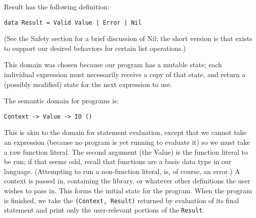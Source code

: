 \documentclass{article}
\begin{document}
Result has the following definition:

\begin{lstlisting}
data Result = Valid Value | Error | Nil
\end{lstlisting}

(See the Safety section for a brief discussion of Nil; the short version is that exists to support our desired behaviors for certain list operations.)

This domain was chosen because our program has a mutable state; each individual expression must necessarily receive a copy of that state, and return a (possibly modified) state for the next expression to use.

The semantic domain for programs is:

\begin{lstlisting}
Context -> Value -> IO ()
\end{lstlisting}

This is akin to the domain for statement evaluation, except that we cannot take an expression (because no program is yet running to evaluate it) so we must take a raw function literal. The second argument (the Value) is the function literal to be run; if that seems odd, recall that functions are a basic data type in our language. (Attempting to run a non-function literal, is, of course, an error.)  A context is passed in, containing the library, or whatever other definitions the user wishes to pass in.  This forms the initial state for the program. When the program is finished, we take the \texttt{(Context, Result)} returned by evaluation of its final statement and print only the user-relevant portions of the \texttt{Result}.
\end{document}
